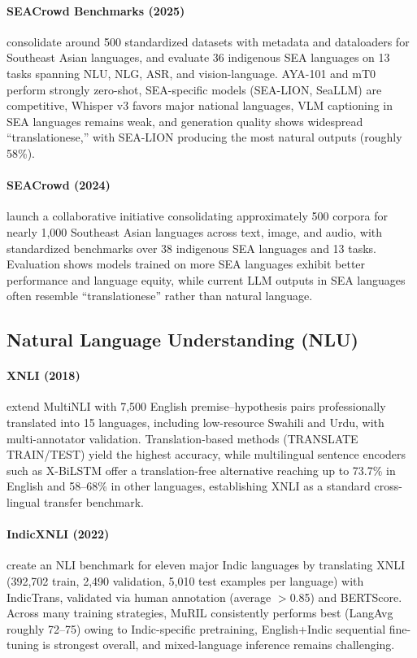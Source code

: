 \documentclass[letterpaper]{article}
\begin{document}
\paragraph{SEACrowd Benchmarks (2025)} \citet{lovenia2025seacrowdmultilingualmultimodaldata} consolidate around 500 standardized datasets with metadata and dataloaders for Southeast Asian languages, and evaluate 36 indigenous SEA languages on 13 tasks spanning NLU, NLG, ASR, and vision-language. AYA-101 and mT0 perform strongly zero-shot, SEA-specific models (SEA-LION, SeaLLM) are competitive, Whisper v3 favors major national languages, VLM captioning in SEA languages remains weak, and generation quality shows widespread ``translationese,'' with SEA-LION producing the most natural outputs (roughly 58\%).

\paragraph{SEACrowd (2024)} \citet{lovenia2024seacrowd} launch a collaborative initiative consolidating approximately 500 corpora for nearly 1,000 Southeast Asian languages across text, image, and audio, with standardized benchmarks over 38 indigenous SEA languages and 13 tasks. Evaluation shows models trained on more SEA languages exhibit better performance and language equity, while current LLM outputs in SEA languages often resemble ``translationese'' rather than natural language.

\subsection{Natural Language Understanding (NLU)}

\paragraph{XNLI (2018)} \citet{conneau2018xnlievaluatingcrosslingualsentence} extend MultiNLI with 7,500 English premise--hypothesis pairs professionally translated into 15 languages, including low-resource Swahili and Urdu, with multi-annotator validation. Translation-based methods (TRANSLATE TRAIN/TEST) yield the highest accuracy, while multilingual sentence encoders such as X-BiLSTM offer a translation-free alternative reaching up to 73.7\% in English and 58--68\% in other languages, establishing XNLI as a standard cross-lingual transfer benchmark.

\paragraph{IndicXNLI (2022)} \citet{aggarwal2022indicxnlievaluatingmultilingualinference} create an NLI benchmark for eleven major Indic languages by translating XNLI (392,702 train, 2,490 validation, 5,010 test examples per language) with IndicTrans, validated via human annotation (average $>$0.85) and BERTScore. Across many training strategies, MuRIL consistently performs best (LangAvg roughly 72--75) owing to Indic-specific pretraining, English+Indic sequential fine-tuning is strongest overall, and mixed-language inference remains challenging.
\end{document}
